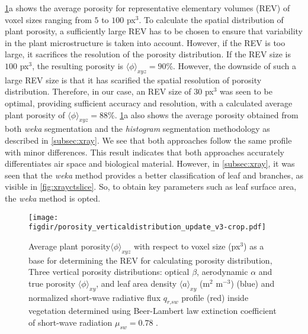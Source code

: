 \cref{fig:porositydistribution}a shows the average porosity for representative elementary volumes (REV) of voxel sizes ranging from $5$ to $100$ px$^3$. To calculate the spatial distribution of plant porosity, a sufficiently large REV has to be chosen to ensure that variability in the plant microstructure is taken into account. However, if the REV is too large, it sacrifices the resolution of the porosity distribution. If the REV size is $100$ px$^3$, the resulting porosity is $\langle \phi \rangle_{\textit{xyz}}  = 90$\%. However, the downside of such a large REV size is that it has scarified the spatial resolution of porosity distribution. Therefore, in our case, an REV size of $30$ px$^3$ was seen to be optimal, providing sufficient accuracy and resolution, with a calculated average plant porosity of $\langle \phi \rangle_{\textit{xyz}} = 88$\%. \cref{fig:porositydistribution}a also shows the average porosity obtained from both \textit{weka} segmentation and the \textit{histogram} segmentation methodology as described in \cref{subsec:xray}. We see that both approaches follow the same profile with minor differences. This result indicates that both approaches accurately differentiates air space and biological material. However, in \cref{subsec:xray}, it was seen that the \textit{weka} method provides a better classification of leaf and branches, as visible in \cref{fig:xrayctslice}. So, to obtain key parameters such as leaf surface area, the \textit{weka} method is opted.

\begin{figure}[p]
		\centering
		\texttt{[image: \\figdir/porosity\_verticaldistribution\_update\_v3-crop.pdf]}
		\caption{ Average plant porosity$\langle \phi \rangle_{xyz}$ with respect to voxel size (px$^3$) as a base for determining the REV for calculating porosity distribution,  Three vertical porosity distributions: optical $\beta$, aerodynamic $\alpha$ and true porosity $\langle \phi \rangle_{xy}$, and  leaf area density $\langle a \rangle_{xy}$ (m$^2$ m$^{-3}$) (blue) and normalized short-wave radiative flux $q_{\textit{r,sw}}$ profile (red) inside vegetation determined using Beer-Lambert law extinction coefficient of short-wave radiation $\mu_{\textit{sw}}=0.78$ \citep{Manickathan2018a}.}
		\label{fig:porositydistribution}
\end{figure}


